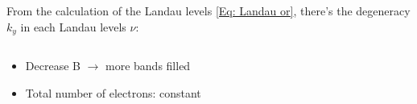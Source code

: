 \documentclass{beamer}
\begin{document}
\begin{frame}
\quad From the calculation of the Landau levels \eqref{Eq: Landau or}, there's the degeneracy \(k_y\) in each Landau levels \(\nu\):
\begin{columns}
\begin{column}{0.5\linewidth}
\begin{itemize}
\item Decrease B $\to$ more bands filled
\item Total number of electrons: constant
\end{itemize} 
\end{column}
\begin{column}{0.5\linewidth}
\end{column}
\end{columns}
\end{frame}
\end{document}
